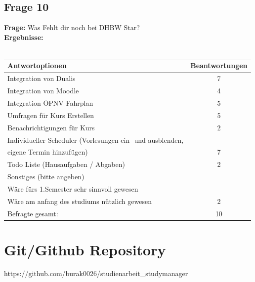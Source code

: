 \section{Frage 10 \label{frage10}}

\textbf{Frage:} Was Fehlt dir noch bei DHBW Star?\\
\textbf{Ergebnisse:}\\
\\
\begin{tabular}{|l|c|}\hline
	\textbf{Antwortoptionen} & \textbf{Beantwortungen} \\\hline
	Integration von Dualis  	& 7 \\\hline
	Integration von Moodle 	& 4 \\\hline
	Integration ÖPNV Fahrplan  			& 5 \\\hline
	Umfragen für Kurs Erstellen & 5 \\\hline
	Benachrichtigungen für Kurs  & 2 \\\hline
	Individueller Scheduler (Vorlesungen ein- und ausblenden,\\ eigene Termin hinzufügen) & 7 \\\hline
	Todo Liste (Hausaufgaben / Abgaben) & 2 \\\hline
	Sonstiges (bitte angeben)\\
	Wäre fürs 1.Semester sehr sinnvoll gewesen\\
	Wäre am anfang des studiums nützlich gewesen & 2 \\\hline 
	Befragte gesamt:			& 10 \\\hline			
\end{tabular}

\begin{figure}[htbp]
\end{figure}



\chapter{Git/Github Repository}
https://github.com/burak0026/studienarbeit\_studymanager